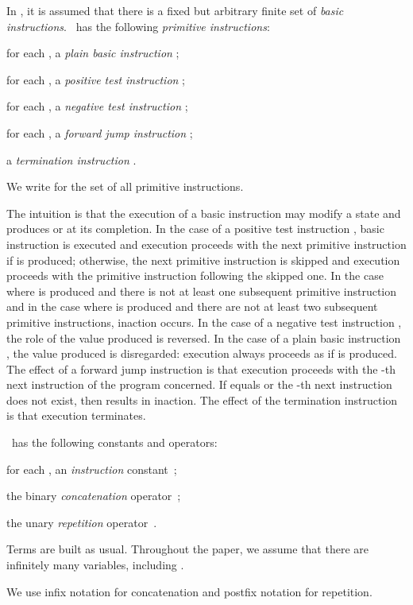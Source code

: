 \documentclass[fleqn]{llncs}
\begin{document}
In \PGA, it is assumed that there is a fixed but arbitrary finite set
 of \emph{basic instructions}.
\PGA\ has the following \emph{primitive instructions}:
\begin{iteml}
\item
for each , a \emph{plain basic instruction} ;
\item
for each , a \emph{positive test instruction} ;
\item
for each , a \emph{negative test instruction} ;
\item
for each , a \emph{forward jump instruction} ;
\item
a \emph{termination instruction} .
\end{iteml}
We write  for the set of all primitive instructions.

The intuition is that the execution of a basic instruction  may
modify a state and produces  or  at its completion.
In the case of a positive test instruction , basic instruction
 is executed and execution proceeds with the next primitive
instruction if  is produced; otherwise, the next primitive
instruction is skipped and execution proceeds with the primitive
instruction following the skipped one.
In the case where  is produced and there is not at least one
subsequent primitive instruction and in the case where  is
produced and there are not at least two subsequent primitive
instructions, inaction occurs.
In the case of a negative test instruction , the role of the
value produced is reversed.
In the case of a plain basic instruction , the value produced is
disregarded: execution always proceeds as if  is produced.
The effect of a forward jump instruction  is that execution
proceeds with the -th next instruction of the program concerned.
If  equals  or the -th next instruction does not exist, then
 results in inaction.
The effect of the termination instruction  is that execution
terminates.

\PGA\ has the following constants and operators:
\begin{iteml}
\item
for each , an \emph{instruction} constant \,;
\item
the binary \emph{concatenation} operator \,;
\item
the unary \emph{repetition} operator \,.
\end{iteml}
Terms are built as usual.
Throughout the paper, we assume that there are infinitely many
variables, including .

We use infix notation for concatenation and postfix notation for
repetition.
\end{document}
